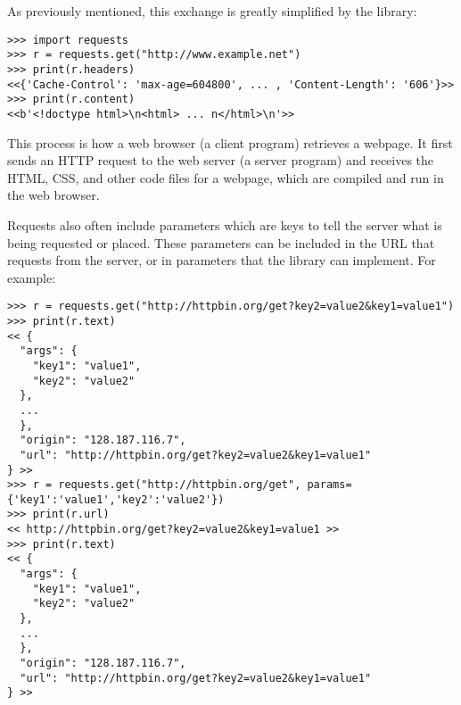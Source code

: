 
As previously mentioned, this exchange is greatly simplified by the  library:

\begin{lstlisting}
>>> import requests
>>> r = requests.get("http://www.example.net")
>>> print(r.headers)
<<{'Cache-Control': 'max-age=604800', ... , 'Content-Length': '606'}>>
>>> print(r.content)
<<b'<!doctype html>\n<html> ... n</html>\n'>>
\end{lstlisting}

This process is how a web browser (a client program) retrieves a webpage.
It first sends an HTTP request to the web server (a server program) and receives the HTML, CSS, and other code files for a webpage, which are compiled and run in the web browser.

Requests also often include parameters which are keys to tell the server what is being requested or placed.
These parameters can be included in the URL that requests from the server, or in parameters that the  library can implement.
For example:

\begin{lstlisting}
>>> r = requests.get("http://httpbin.org/get?key2=value2&key1=value1")
>>> print(r.text)
<< {
  "args": {
    "key1": "value1",
    "key2": "value2"
  },
  ...
  },
  "origin": "128.187.116.7",
  "url": "http://httpbin.org/get?key2=value2&key1=value1"
} >>
>>> r = requests.get("http://httpbin.org/get", params={'key1':'value1','key2':'value2'})
>>> print(r.url)
<< http://httpbin.org/get?key2=value2&key1=value1 >>
>>> print(r.text)
<< {
  "args": {
    "key1": "value1",
    "key2": "value2"
  },
  ...
  },
  "origin": "128.187.116.7",
  "url": "http://httpbin.org/get?key2=value2&key1=value1"
} >>
\end{lstlisting}

